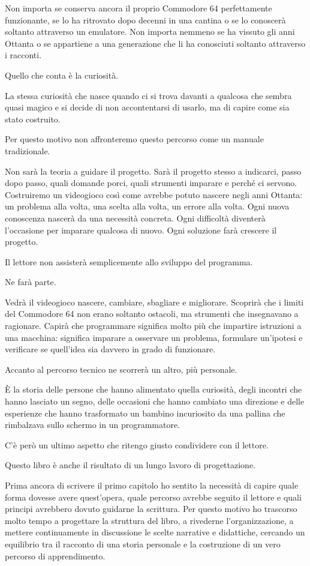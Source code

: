 \documentclass{article}
\begin{document}
Non importa se conserva ancora il proprio Commodore 64 perfettamente funzionante, se lo ha ritrovato dopo decenni in una
cantina o se lo conoscerà soltanto attraverso un emulatore. Non importa nemmeno se ha vissuto gli anni Ottanta o se
appartiene a una generazione che li ha conosciuti soltanto attraverso i racconti.

Quello che conta è la curiosità.

La stessa curiosità che nasce quando ci si trova davanti a qualcosa che sembra quasi magico e si decide di non
accontentarsi di usarlo, ma di capire come sia stato costruito.

Per questo motivo non affronteremo questo percorso come un manuale tradizionale.

Non sarà la teoria a guidare il progetto. Sarà il progetto stesso a indicarci, passo dopo passo, quali domande porci,
quali strumenti imparare e perché ci servono. Costruiremo un videogioco così come avrebbe potuto nascere negli anni
Ottanta: un problema alla volta, una scelta alla volta, un errore alla volta. Ogni nuova conoscenza nascerà da una
necessità concreta. Ogni difficoltà diventerà l'occasione per imparare qualcosa di nuovo. Ogni soluzione farà crescere
il progetto.

Il lettore non assisterà semplicemente allo sviluppo del programma.

Ne farà parte.

Vedrà il videogioco nascere, cambiare, sbagliare e migliorare. Scoprirà che i limiti del Commodore 64 non erano soltanto
ostacoli, ma strumenti che insegnavano a ragionare. Capirà che programmare significa molto più che impartire istruzioni
a una macchina: significa imparare a osservare un problema, formulare un'ipotesi e verificare se quell'idea sia davvero
in grado di funzionare.

Accanto al percorso tecnico ne scorrerà un altro, più personale.

È la storia delle persone che hanno alimentato quella curiosità, degli incontri che hanno lasciato un segno, delle
occasioni che hanno cambiato una direzione e delle esperienze che hanno trasformato un bambino incuriosito da una
pallina che rimbalzava sullo schermo in un programmatore.

C'è però un ultimo aspetto che ritengo giusto condividere con il lettore.

Questo libro è anche il risultato di un lungo lavoro di progettazione.

Prima ancora di scrivere il primo capitolo ho sentito la necessità di capire quale forma dovesse avere quest'opera,
quale percorso avrebbe seguito il lettore e quali principi avrebbero dovuto guidarne la scrittura. Per questo motivo ho
trascorso molto tempo a progettare la struttura del libro, a rivederne l'organizzazione, a mettere continuamente in
discussione le scelte narrative e didattiche, cercando un equilibrio tra il racconto di una storia personale e la
costruzione di un vero percorso di apprendimento.
\end{document}
